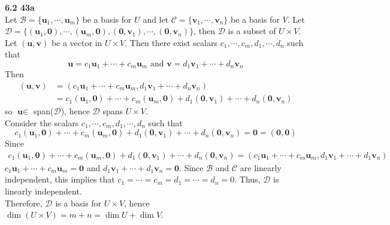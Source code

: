 \textbf{6.2 43a} \\
Let $\mathcal{B} = \{\textbf{u}_1, \cdots, \textbf{u}_m\}$ be a basis for $U$ and let $\mathcal{C} = \{\textbf{v}_1, \cdots, \textbf{v}_n\}$ be a basis for $V$. Let $\mathcal{D} = \{(\textbf{u}_1, \textbf{0}), \cdots, (\textbf{u}_m, \textbf{0}), (\textbf{0}, \textbf{v}_1), \cdots, (\textbf{0}, \textbf{v}_n)\}$, then $\mathcal{D}$ is a subset of $U \times V$. \\

Let $(\textbf{u}, \textbf{v})$ be a vector in $U \times V$. Then there exist scalars $c_1, \cdots, c_m, d_1, \cdots, d_n$ such that \begin{equation*}
	\textbf{u} = c_1\textbf{u}_1 + \cdots + c_m\textbf{u}_m \mbox{ and } \textbf{v} = d_1\textbf{v}_1 + \cdots + d_n\textbf{v}_n
\end{equation*} Then \begin{align*}
	(\textbf{u}, \textbf{v}) &= (c_1\textbf{u}_1 + \cdots + c_m\textbf{u}_m, d_1\textbf{v}_1 + \cdots + d_n\textbf{v}_n) \\
	&= c_1(\textbf{u}_1, \textbf{0}) + \cdots + c_m(\textbf{u}_m, \textbf{0}) + d_1(\textbf{0}, \textbf{v}_1) + \cdots + d_n(\textbf{0}, \textbf{v}_n)
\end{align*} so $\textbf{u} \in$ span($\mathcal{D}$), hence $\mathcal{D}$ spans $U \times V$. \\

Consider the scalars $c_1, \cdots, c_m, d_1, \cdots, d_n$ such that \begin{equation*}
	c_1(\textbf{u}_1, \textbf{0}) + \cdots + c_m(\textbf{u}_m, \textbf{0}) + d_1(\textbf{0}, \textbf{v}_1) + \cdots + d_n(\textbf{0}, \textbf{v}_n) = \textbf{0} = (\textbf{0}, \textbf{0})
\end{equation*} Since \begin{align*}
	c_1(\textbf{u}_1, \textbf{0}) + \cdots + c_m(\textbf{u}_m, \textbf{0}) + d_1(\textbf{0}, \textbf{v}_1) + \cdots + d_n(\textbf{0}, \textbf{v}_n) = (c_1\textbf{u}_1 + \cdots + c_m\textbf{u}_m, d_1\textbf{v}_1 + \cdots + d_1\textbf{v}_n)
\end{align*} $c_1\textbf{u}_1 + \cdots + c_m\textbf{u}_m = \textbf{0}$ and $d_1\textbf{v}_1 + \cdots + d_1\textbf{v}_n = \textbf{0}$. Since $\mathcal{B}$ and $\mathcal{C}$ are linearly independent, this implies that $c_1 = \cdots = c_m = d_1 = \cdots = d_n = 0$. Thus, $\mathcal{D}$ is linearly independent. \\

Therefore, $\mathcal{D}$ is a basis for $U \times V$, hence $\dim(U \times V) = m + n = \dim U + \dim V$. \\

